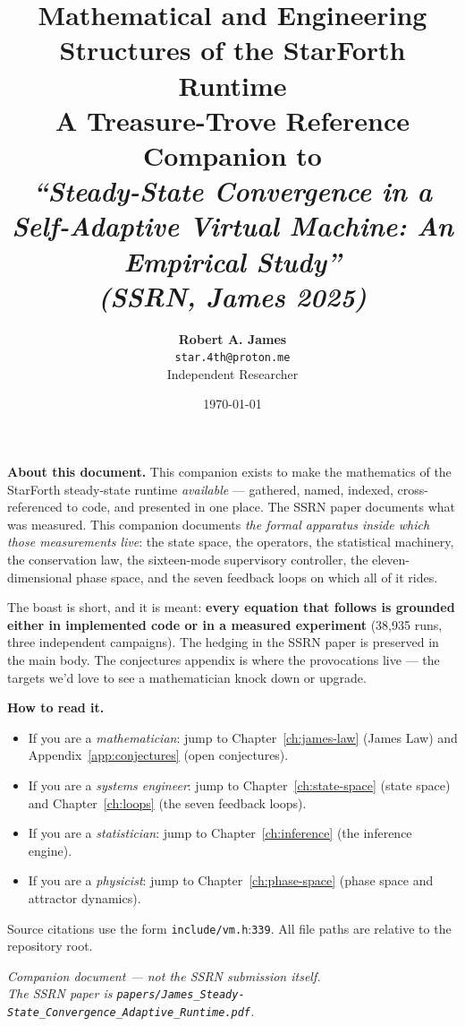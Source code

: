 \documentclass[11pt,letterpaper,openany]{book}
\title{
  \vspace{-2.5em}
  \textbf{\Huge Mathematical and Engineering}\\[0.2em]
  \textbf{\Huge Structures of the StarForth Runtime}\\[1.0em]
  {\Large A Treasure-Trove Reference Companion to}\\[0.3em]
  {\large\itshape ``Steady-State Convergence in a Self-Adaptive
    Virtual Machine: An Empirical Study''}\\[0.3em]
  {\large\itshape (SSRN, James 2025)}
}
\author{
  \textbf{Robert A. James}\\
  {\small \texttt{star.4th@proton.me}}\\
  {\small Independent Researcher}
}
\date{\today}
\theoremstyle{definition}
\theoremstyle{plain}
\newcommand{\sourceref}[2]{\texttt{#1}:\texttt{#2}}
\begin{document}
\frontmatter
\maketitle
\thispagestyle{empty}

\vfill
\noindent\textbf{About this document.} This companion exists to make the
mathematics of the StarForth steady-state runtime \emph{available} ---
gathered, named, indexed, cross-referenced to code, and presented in one
place. The SSRN paper documents what was measured. This companion documents
\emph{the formal apparatus inside which those measurements live}: the state
space, the operators, the statistical machinery, the conservation law, the
sixteen-mode supervisory controller, the eleven-dimensional phase space,
and the seven feedback loops on which all of it rides.

\medskip
\noindent The boast is short, and it is meant: \textbf{every equation that
follows is grounded either in implemented code or in a measured experiment}
(38{,}935 runs, three independent campaigns). The hedging in the SSRN paper
is preserved in the main body. The conjectures appendix is where the
provocations live --- the targets we'd love to see a mathematician knock
down or upgrade.

\medskip
\noindent\textbf{How to read it.}
\begin{itemize}\setlength\itemsep{0pt}
  \item If you are a \emph{mathematician}: jump to Chapter~\ref{ch:james-law}
    (James Law) and Appendix~\ref{app:conjectures} (open conjectures).
  \item If you are a \emph{systems engineer}: jump to
    Chapter~\ref{ch:state-space} (state space) and Chapter~\ref{ch:loops}
    (the seven feedback loops).
  \item If you are a \emph{statistician}: jump to Chapter~\ref{ch:inference}
    (the inference engine).
  \item If you are a \emph{physicist}: jump to Chapter~\ref{ch:phase-space}
    (phase space and attractor dynamics).
\end{itemize}

\noindent Source citations use the form \sourceref{include/vm.h}{339}.
All file paths are relative to the repository root.

\vfill
\noindent\textit{Companion document --- not the SSRN submission itself.\\
The SSRN paper is \texttt{papers/James\_Steady-State\_Convergence\_Adaptive\_Runtime.pdf}.}
\clearpage
\end{document}
